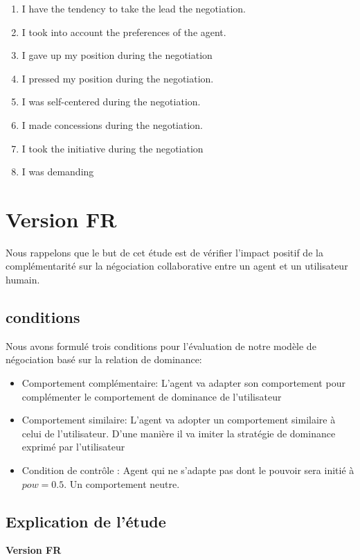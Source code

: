 \documentclass [french]{paper}
\begin{document}
\begin{enumerate}
				\item I have the tendency to take the lead the negotiation.
				\item I took into account the preferences of the agent.
				\item I gave up my position during the negotiation
				\item I pressed my position during the negotiation.
				\item I was self-centered during the negotiation.
				\item I made concessions during the negotiation.
				\item I took the initiative during the negotiation
				\item I was demanding

				
			
				
			\end{enumerate}
			
	
	\section{Version FR}
		Nous rappelons que le but de cet étude est de vérifier l'impact positif de la complémentarité sur la négociation collaborative entre un agent et un utilisateur humain. 
		
		\subsection{conditions}
		
		Nous avons formulé trois conditions pour l'évaluation de notre modèle de négociation basé sur la relation de dominance: 
		\begin{itemize}
			\item Comportement complémentaire: L'agent va adapter son comportement pour complémenter le comportement de dominance de l'utilisateur
			
			\item Comportement similaire: L'agent va adopter un comportement similaire à celui de l'utilisateur. D'une manière il va imiter la stratégie de dominance exprimé par l'utilisateur
			
			\item Condition de contrôle : Agent qui ne s'adapte pas dont le pouvoir sera initié à $pow =0.5$. Un comportement neutre. 
			\end{itemize}
			
			
				\subsection{Explication de l'étude}
				\textbf{ Version FR}
				
\end{document}
